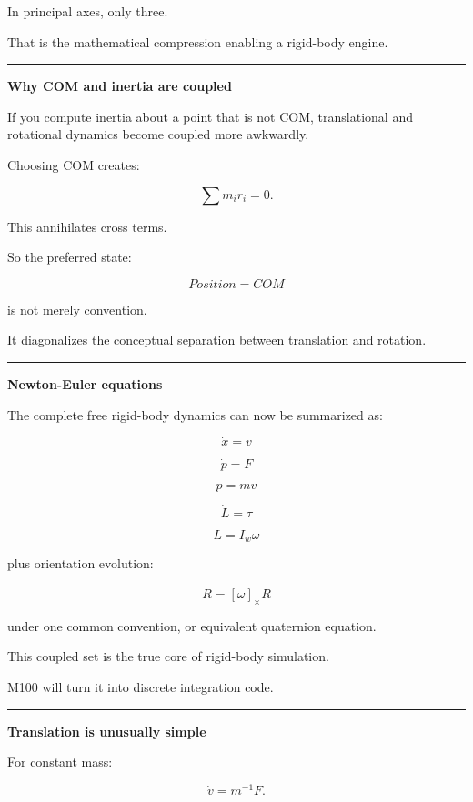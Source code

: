 In principal axes, only three.

That is the mathematical compression enabling a rigid-body engine.

\begin{center}\rule{0.5\linewidth}{0.5pt}\end{center}

\textbf{Why COM and inertia are coupled}

If you compute inertia about a point that is not COM, translational and rotational dynamics become coupled more awkwardly.

Choosing COM creates:

\[
\sum m_ir_i=0.
\]

This annihilates cross terms.

So the preferred state:

\[
\boxed{
Position = COM
}
\]

is not merely convention.

It diagonalizes the conceptual separation between translation and rotation.

\begin{center}\rule{0.5\linewidth}{0.5pt}\end{center}

\textbf{Newton-Euler equations}

The complete free rigid-body dynamics can now be summarized as:

\[
\boxed{
\dot x=v
}
\]

\[
\boxed{
\dot p=F
}
\]

\[
\boxed{
p=mv
}
\]

\[
\boxed{
\dot L=\tau
}
\]

\[
\boxed{
L=I_w\omega
}
\]

plus orientation evolution:

\[
\dot R=[\omega]_\times R
\]

under one common convention, or equivalent quaternion equation.

This coupled set is the true core of rigid-body simulation.

M100 will turn it into discrete integration code.

\begin{center}\rule{0.5\linewidth}{0.5pt}\end{center}

\textbf{Translation is unusually simple}

For constant mass:

\[
\dot v=m^{-1}F.
\]

